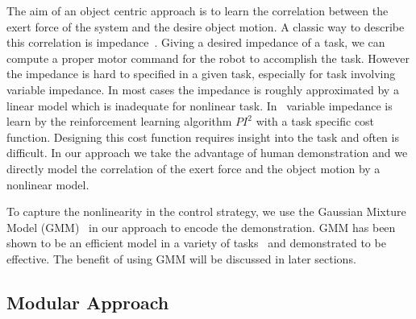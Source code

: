 The aim of an object centric approach is to learn the correlation between the exert force of the system and the desire object motion. A classic way to describe this correlation is impedance~\cite{howard2010transferring,wimbock2012comparison}. Giving a desired impedance of a task, we can compute a proper motor command for the robot to accomplish the task. However the impedance is hard to specified in a given task, especially for task involving variable impedance. 
In most cases the impedance is roughly approximated by a linear model which is inadequate for nonlinear task. In~\cite{buchli2011learning} variable impedance is learn by the reinforcement learning algorithm $PI^2$ with a task specific cost function. Designing this cost function requires insight into the task and often is difficult. In our approach we take the advantage of human demonstration and we directly model the correlation of the exert force and the object motion by a nonlinear model.

To capture the nonlinearity in the control strategy, we use the Gaussian Mixture Model (GMM)~\cite{cohn1996active} in our approach to encode the demonstration. GMM has been shown to be an efficient model in a variety of tasks~\cite{huang2013learning,sauser2011iterative,calinon2007incremental} and demonstrated to be effective. The benefit of using GMM will be discussed in later sections.

\subsection{Modular Approach}



